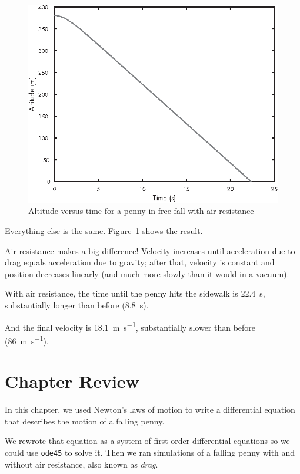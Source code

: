 \begin{figure}[ht]
\centerline{\includegraphics[scale=0.8]{images/figure11_02_new.eps}}
\caption{Altitude versus time for a penny in free fall with air resistance}
\label{fig:penny2}
\end{figure}

Everything else is the same.  Figure~\ref{fig:penny2} shows the result. 

Air resistance makes a big difference! Velocity increases until
acceleration due to drag equals acceleration due to gravity; after that, velocity is constant and position decreases linearly (and much more slowly than it would in a vacuum).

With air resistance, the time until the penny hits the sidewalk is \SI{22.4}{\second}, substantially longer than before (\SI{8.8}{\second}).

And the final velocity is \SI{18.1}{\meter \per \second}, substantially slower than before (\SI{86}{\meter \per \second}).

\section{Chapter Review}

In this chapter, we used Newton's laws of motion to write a differential equation that describes the motion of a falling penny.  

We rewrote that equation as a system of first-order differential equations so we could use \lstinline{ode45} to solve it.  Then we ran simulations of a falling penny with and without air resistance, also known as \emph{drag}.

